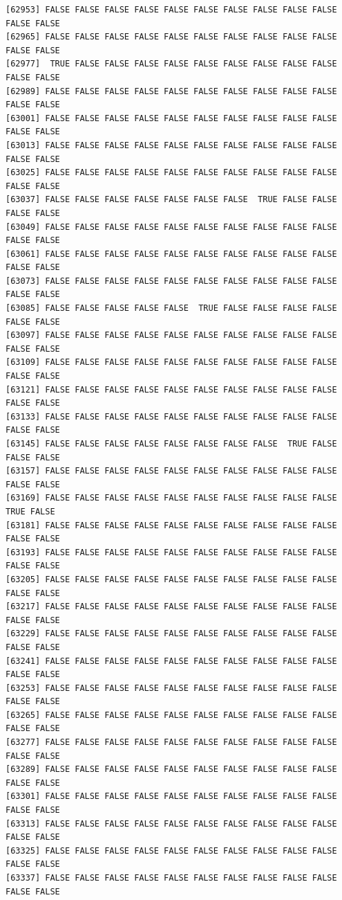 \documentclass[
  a4paper,
  DIV=11,
  numbers=noendperiod]{scrartcl}
\begin{document}
\begin{verbatim}
[62953] FALSE FALSE FALSE FALSE FALSE FALSE FALSE FALSE FALSE FALSE FALSE FALSE
[62965] FALSE FALSE FALSE FALSE FALSE FALSE FALSE FALSE FALSE FALSE FALSE FALSE
[62977]  TRUE FALSE FALSE FALSE FALSE FALSE FALSE FALSE FALSE FALSE FALSE FALSE
[62989] FALSE FALSE FALSE FALSE FALSE FALSE FALSE FALSE FALSE FALSE FALSE FALSE
[63001] FALSE FALSE FALSE FALSE FALSE FALSE FALSE FALSE FALSE FALSE FALSE FALSE
[63013] FALSE FALSE FALSE FALSE FALSE FALSE FALSE FALSE FALSE FALSE FALSE FALSE
[63025] FALSE FALSE FALSE FALSE FALSE FALSE FALSE FALSE FALSE FALSE FALSE FALSE
[63037] FALSE FALSE FALSE FALSE FALSE FALSE FALSE  TRUE FALSE FALSE FALSE FALSE
[63049] FALSE FALSE FALSE FALSE FALSE FALSE FALSE FALSE FALSE FALSE FALSE FALSE
[63061] FALSE FALSE FALSE FALSE FALSE FALSE FALSE FALSE FALSE FALSE FALSE FALSE
[63073] FALSE FALSE FALSE FALSE FALSE FALSE FALSE FALSE FALSE FALSE FALSE FALSE
[63085] FALSE FALSE FALSE FALSE FALSE  TRUE FALSE FALSE FALSE FALSE FALSE FALSE
[63097] FALSE FALSE FALSE FALSE FALSE FALSE FALSE FALSE FALSE FALSE FALSE FALSE
[63109] FALSE FALSE FALSE FALSE FALSE FALSE FALSE FALSE FALSE FALSE FALSE FALSE
[63121] FALSE FALSE FALSE FALSE FALSE FALSE FALSE FALSE FALSE FALSE FALSE FALSE
[63133] FALSE FALSE FALSE FALSE FALSE FALSE FALSE FALSE FALSE FALSE FALSE FALSE
[63145] FALSE FALSE FALSE FALSE FALSE FALSE FALSE FALSE  TRUE FALSE FALSE FALSE
[63157] FALSE FALSE FALSE FALSE FALSE FALSE FALSE FALSE FALSE FALSE FALSE FALSE
[63169] FALSE FALSE FALSE FALSE FALSE FALSE FALSE FALSE FALSE FALSE  TRUE FALSE
[63181] FALSE FALSE FALSE FALSE FALSE FALSE FALSE FALSE FALSE FALSE FALSE FALSE
[63193] FALSE FALSE FALSE FALSE FALSE FALSE FALSE FALSE FALSE FALSE FALSE FALSE
[63205] FALSE FALSE FALSE FALSE FALSE FALSE FALSE FALSE FALSE FALSE FALSE FALSE
[63217] FALSE FALSE FALSE FALSE FALSE FALSE FALSE FALSE FALSE FALSE FALSE FALSE
[63229] FALSE FALSE FALSE FALSE FALSE FALSE FALSE FALSE FALSE FALSE FALSE FALSE
[63241] FALSE FALSE FALSE FALSE FALSE FALSE FALSE FALSE FALSE FALSE FALSE FALSE
[63253] FALSE FALSE FALSE FALSE FALSE FALSE FALSE FALSE FALSE FALSE FALSE FALSE
[63265] FALSE FALSE FALSE FALSE FALSE FALSE FALSE FALSE FALSE FALSE FALSE FALSE
[63277] FALSE FALSE FALSE FALSE FALSE FALSE FALSE FALSE FALSE FALSE FALSE FALSE
[63289] FALSE FALSE FALSE FALSE FALSE FALSE FALSE FALSE FALSE FALSE FALSE FALSE
[63301] FALSE FALSE FALSE FALSE FALSE FALSE FALSE FALSE FALSE FALSE FALSE FALSE
[63313] FALSE FALSE FALSE FALSE FALSE FALSE FALSE FALSE FALSE FALSE FALSE FALSE
[63325] FALSE FALSE FALSE FALSE FALSE FALSE FALSE FALSE FALSE FALSE FALSE FALSE
[63337] FALSE FALSE FALSE FALSE FALSE FALSE FALSE FALSE FALSE FALSE FALSE FALSE

\end{verbatim}
\end{document}
